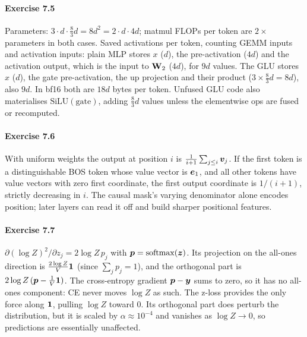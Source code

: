 \paragraph{Exercise 7.5} Parameters: $3\cdot d\cdot\frac83d=8d^2=2\cdot d\cdot4d$; matmul FLOPs per token are
$2\times$ parameters in both cases. Saved activations per token, counting GEMM inputs and activation inputs:
plain MLP stores $x$ ($d$), the pre-activation ($4d$) and the activation output, which is the input to
$\mathbf{W}_2$ ($4d$), for $9d$ values. The GLU stores $x$ ($d$), the gate pre-activation, the up projection and
their product ($3\times\frac83d=8d$), also $9d$. In bf16 both are $18d$ bytes per token. Unfused GLU code also
materialises $\mathrm{SiLU}(\text{gate})$, adding $\frac83d$ values unless the elementwise ops are fused or
recomputed.

\paragraph{Exercise 7.6} With uniform weights the output at position $i$ is $\frac{1}{i+1}\sum_{j\le i}\bm{v}_j$.
If the first token is a distinguishable BOS token whose value vector is $\bm{e}_1$, and all other tokens have
value vectors with zero first coordinate, the first output coordinate is $1/(i+1)$, strictly decreasing in $i$.
The causal mask's varying denominator alone encodes position; later layers can read it off and build
sharper positional features.

\paragraph{Exercise 7.7} $\partial(\log Z)^2/\partial z_j=2\log Z\,p_j$ with $\bm{p}=\operatorname{softmax}(\bm{z})$. Its
projection on the all-ones direction is $\frac{2\log Z}{V}\bm{1}$ (since $\sum_jp_j=1$), and the orthogonal
part is $2\log Z\,(\bm{p}-\frac1V\bm{1})$. The cross-entropy gradient $\bm{p}-\bm{y}$ sums to zero, so it
has no all-ones component: CE never moves $\log Z$ as such. The z-loss provides the only force along
$\bm{1}$, pulling $\log Z$ toward 0. Its orthogonal part does perturb the distribution, but it is scaled by
$\alpha\approx10^{-4}$ and vanishes as $\log Z\to0$, so predictions are essentially unaffected.

